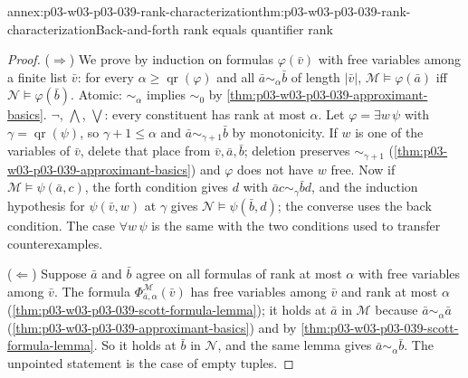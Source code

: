 \begin{annexitem}{annex:p03-w03-p03-039-rank-characterization}{thm:p03-w03-p03-039-rank-characterization}{Back-and-forth rank equals quantifier rank}
\begin{proof}
(\(\Rightarrow\)) We prove by induction on formulas \(\varphi(\bar v)\) with
free variables among a finite list \(\bar v\): for every \(\alpha\ge
\operatorname{qr}(\varphi)\) and all \(\bar a\sim_\alpha\bar b\) of length
\(\lvert\bar v\rvert\), \(\mathcal M\models\varphi(\bar a)\) iff
\(\mathcal N\models\varphi(\bar b)\). Atomic: \(\sim_\alpha\) implies
\(\sim_0\) by \cref{thm:p03-w03-p03-039-approximant-basics}. \(\neg\),
\(\bigwedge\), \(\bigvee\): every constituent has rank at most \(\alpha\).
Let \(\varphi=\exists w\,\psi\) with \(\gamma=\operatorname{qr}(\psi)\),
so \(\gamma+1\le\alpha\) and \(\bar a\sim_{\gamma+1}\bar b\) by monotonicity.
If \(w\) is one of the variables of \(\bar v\), delete that place from
\(\bar v,\bar a,\bar b\); deletion preserves \(\sim_{\gamma+1}\)
(\cref{thm:p03-w03-p03-039-approximant-basics}) and \(\varphi\) does not
have \(w\) free. Now if \(\mathcal M\models\psi(\bar a,c)\), the forth
condition gives \(d\) with \(\bar ac\sim_\gamma\bar bd\), and the induction
hypothesis for \(\psi(\bar v,w)\) at \(\gamma\) gives
\(\mathcal N\models\psi(\bar b,d)\); the converse uses the back condition.
The case \(\forall w\,\psi\) is the same with the two conditions used to
transfer counterexamples.

(\(\Leftarrow\)) Suppose \(\bar a\) and \(\bar b\) agree on all formulas of
rank at most \(\alpha\) with free variables among \(\bar v\). The formula
\(\Phi^{\mathcal M}_{\bar a,\alpha}(\bar v)\) has free variables among
\(\bar v\) and rank at most \(\alpha\)
(\cref{thm:p03-w03-p03-039-scott-formula-lemma}); it holds at \(\bar a\) in
\(\mathcal M\) because \(\bar a\sim_\alpha\bar a\)
(\cref{thm:p03-w03-p03-039-approximant-basics}) and by
\cref{thm:p03-w03-p03-039-scott-formula-lemma}. So it holds at \(\bar b\) in
\(\mathcal N\), and the same lemma gives \(\bar a\sim_\alpha\bar b\). The
unpointed statement is the case of empty tuples.
\end{proof}
\end{annexitem}

